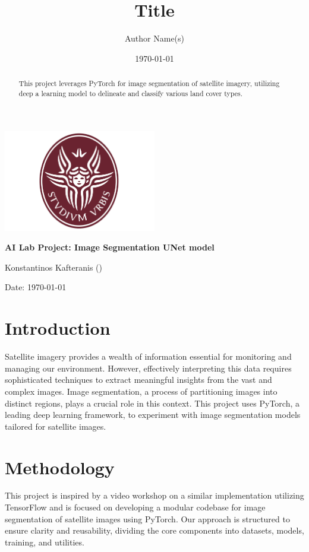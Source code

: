 \documentclass{article}
\title{Title}
\author{Author Name(s)}
\date{\today}
\begin{document}
\begin{titlepage}
    \centering
    \includegraphics[width=0.5\textwidth]{../assets/sapienza_logo.png} 
    \vfill
    {\bfseries\Large
        AI Lab Project: Image Segmentation UNet model\par
    }
    \vfill
    {\Large
        Konstantinos Kafteranis ()\par
    }
    \vfill
    {\large
        Date: \today\par
    }
\end{titlepage}

\begin{abstract}
    This project leverages PyTorch for image segmentation of satellite imagery, utilizing deep a learning model to  delineate and classify various land cover types. \end{abstract}

\section{Introduction}
Satellite imagery provides a wealth of information essential for monitoring and managing our environment. However, effectively interpreting this data requires sophisticated techniques to extract meaningful insights from the vast and complex images. Image segmentation, a process of partitioning images into distinct regions, plays a crucial role in this context. This project uses PyTorch, a leading deep learning framework, to experiment with image segmentation models tailored for satellite images.

\section{Methodology}
This project is inspired by a video workshop on a similar implementation utilizing TensorFlow and is focused on developing a modular codebase for image segmentation of satellite images using PyTorch. Our approach is structured to ensure clarity and reusability, dividing the core components into datasets, models, training, and utilities.
\end{document}

